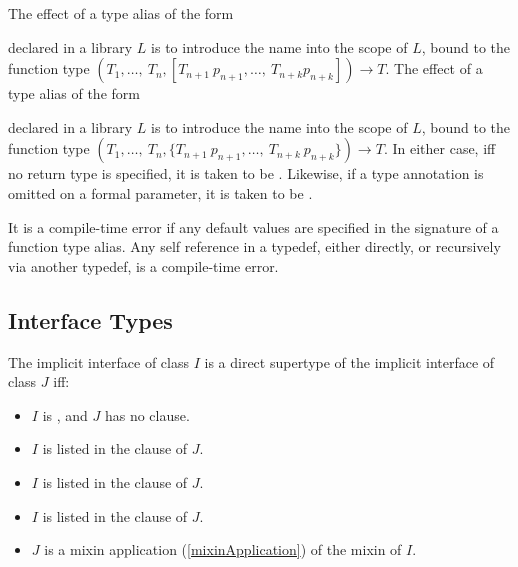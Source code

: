 \documentclass{article}
\begin{document}

\LMHash{}
The effect of a type alias of the form


\noindent
declared in a library $L$ is to introduce the name \id{} into the scope of $L$, bound to the function type
$(T_1, \ldots,\ T_n, [T_{n+1}\ p_{n+1}, \ldots,\ T_{n+k} p_{n+k}]) \rightarrow T$.
The effect of a type alias of the form


\noindent
declared in a library $L$ is to introduce the name \id{} into the scope of $L$, bound to the function type
$(T_1, \ldots,\ T_n, \{T_{n+1}\ p_{n+1}, \ldots,\ T_{n+k}\ p_{n+k}\}) \rightarrow T$.
In either case, if{}f no return type is specified, it is taken to be \DYNAMIC{}.
Likewise, if a type annotation is omitted on a formal parameter, it is taken to be \DYNAMIC{}.

\LMHash{}
It is a compile-time error if any default values are specified in the signature of a function type alias.
Any self reference in a typedef, either directly, or recursively via another typedef, is a compile-time error.


\subsection{Interface Types}

\LMHash{}
The implicit interface of class $I$ is a direct supertype of the implicit interface of class $J$ if{}f:
\begin{itemize}
\item $I$ is , and $J$ has no \EXTENDS{} clause.
\item $I$ is listed in the \EXTENDS{} clause of $J$.
\item $I$ is listed in the \IMPLEMENTS{} clause of $J$.
\item $I$ is listed in the \WITH{} clause of $J$.
\item $J$ is a mixin application (\ref{mixinApplication}) of the mixin of $I$.
\end{itemize}
\end{document}

